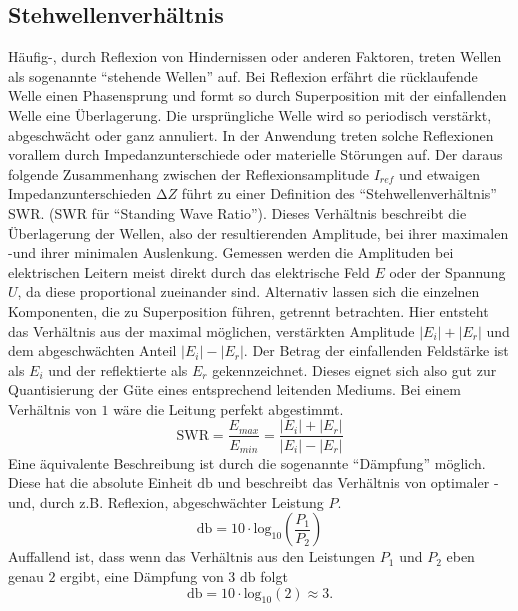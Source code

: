 \subsection{Stehwellenverhältnis} 
Häufig-, durch Reflexion von Hindernissen oder anderen Faktoren, treten Wellen als sogenannte \enquote{stehende Wellen} auf. %
Bei Reflexion erfährt die rücklaufende Welle einen Phasensprung und formt so durch Superposition mit der einfallenden Welle eine Überlagerung. Die ursprüngliche Welle wird so periodisch verstärkt, abgeschwächt oder ganz annuliert. 
In der Anwendung treten solche Reflexionen vorallem durch Impedanzunterschiede oder materielle Störungen auf. Der daraus folgende Zusammenhang zwischen der Reflexionsamplitude $I_{ref}$ und etwaigen Impedanzunterschieden $\increment Z$
führt zu einer Definition des \enquote{Stehwellenverhältnis} SWR. (SWR für \enquote{Standing Wave Ratio}). 
Dieses Verhältnis beschreibt die Überlagerung der Wellen, also der resultierenden Amplitude, bei ihrer maximalen -und ihrer minimalen Auslenkung. 
Gemessen werden die Amplituden bei elektrischen Leitern meist direkt durch das elektrische Feld $E$ oder der Spannung $U$, da diese proportional zueinander sind.
Alternativ lassen sich die einzelnen Komponenten, die zu Superposition führen, getrennt betrachten. Hier entsteht das Verhältnis aus der maximal möglichen, verstärkten Amplitude $|E_i| + |E_r|$ und dem abgeschwächten Anteil $|E_i| - |E_r|$.
Der Betrag der einfallenden Feldstärke ist als $E_i$ und der reflektierte als $E_r$ gekennzeichnet. Dieses eignet sich also gut zur Quantisierung der Güte eines entsprechend leitenden Mediums. Bei einem Verhältnis von $1$ wäre die Leitung perfekt abgestimmt.
\begin{equation*}
    \text{SWR} = \frac{E_{max}}{E_{min}} =  \frac{|E_i| + |E_r|}{|E_i| - |E_r|}
\end{equation*}
Eine äquivalente Beschreibung ist durch die sogenannte \enquote{Dämpfung} möglich. Diese hat die absolute Einheit $\si{\decibel}$ und beschreibt das Verhältnis von optimaler -und, durch z.B. Reflexion, abgeschwächter Leistung $P$. 
\begin{equation*}
    \si{\decibel} = 10 \cdot \text{log}_{10} \left(\frac{P_1}{P_2}\right)
\end{equation*}
Auffallend ist, dass wenn das Verhältnis aus den Leistungen $P_1$ und $P_2$ eben genau $2$ ergibt, eine Dämpfung von 3 $\si{\decibel}$ folgt
\begin{equation*}
    \si{\decibel} = 10 \cdot \text{log}_{10} (2) \approx 3.
\end{equation*}
